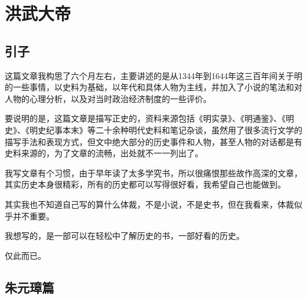 \fancyhead[RO]{{\tiny{\textcolor{Gray}{\faQuoteRight\ }}}\thepage}
\fancyhead[LE]{{\tiny{\textcolor{Gray}{\faQuoteRight\ }}}\thepage}
\fancyfoot[LE,RO]{}
\fancyfoot[LO,CE]{}
\fancyfoot[CO,RE]{}
\setcounter{part}{0}
\setcounter{chapter}{1}
\setcounter{section}{0}
\part{洪武大帝}
\chapter*{引子}
\ifnum{}
	\begin{multicols}{\theparacolNo}
		\fi
		这篇文章我构思了六个月左右，主要讲述的是从1344年到1644年这三百年间关于明的一些事情，以史料为基础，以年代和具体人物为主线，并加入了小说的笔法和对人物的心理分析，以及对当时政治经济制度的一些评价。

		要说明的是，这篇文章是描写正史的，资料来源包括《明实录》、《明通鉴》、《明史》、《明史纪事本末》等二十余种明代史料和笔记杂谈，虽然用了很多流行文学的描写手法和表现方式，但文中绝大部分的历史事件和人物，甚至人物的对话都是有史料来源的，为了文章的流畅，出处就不一一列出了。

		我写文章有个习惯，由于早年读了太多学究书，所以很痛恨那些故作高深的文章，其实历史本身很精彩，所有的历史都可以写得很好看，我希望自己也能做到。

		其实我也不知道自己写的算什么体裁，不是小说，不是史书，但在我看来，体裁似乎并不重要。

		我想写的，是一部可以在轻松中了解历史的书，一部好看的历史。

		仅此而已。
		\ifnum{}
	\end{multicols}
\fi
\newpage
\chapter*{朱元璋篇}
